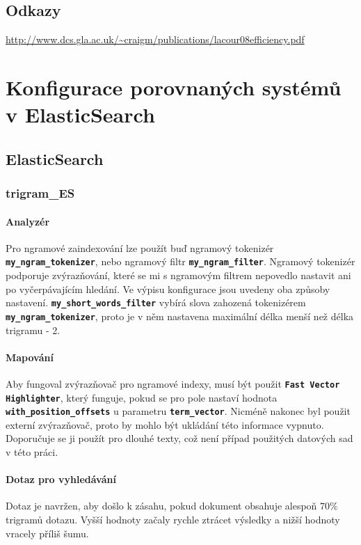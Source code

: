 \documentclass[11pt,letterpaper,oneside,openright]{book}
\newcommand{\bftt}[1]{\texttt{\textbf{#1}}}
\begin{document}
\section*{Odkazy}
\url{http://www.dcs.gla.ac.uk/~craigm/publications/lacour08efficiency.pdf}




\appendix
\chapter{Konfigurace porovnaných systémů v ElasticSearch}\label{appendix:search_config}
\section{ElasticSearch}
\subsection{trigram\_ES}
\subsubsection{Analyzér}
Pro ngramové zaindexování lze použít buď ngramový tokenizér
\bftt{my\_ngram\_tokenizer}, nebo ngramový filtr \bftt{my\_ngram\_filter}.
Ngramový tokenizér podporuje zvýrazňování, které se mi s ngramovým filtrem
nepovedlo nastavit ani po vyčerpávajícím hledání. Ve výpisu konfigurace jsou
uvedeny oba způsoby nastavení. \bftt{my\_short\_words\_filter} vybírá slova
zahozená tokenizérem \bftt{my\_ngram\_tokenizer}, proto je v něm nastavena
maximální délka menší než délka trigramu - 2.



\subsubsection{Mapování}
Aby fungoval zvýrazňovač pro ngramové indexy, musí být použit \bftt{Fast
Vector Highlighter}, který funguje, pokud se pro pole nastaví hodnota
\bftt{with\_position\_offsets} u parametru \bftt{term\_vector}. Nicméně
nakonec byl použit externí zvýrazňovač, proto by mohlo být ukládání této
informace vypnuto. Doporučuje se ji použít pro dlouhé texty, což není
případ použitých datových sad v této práci.



\subsubsection{Dotaz pro vyhledávání}
Dotaz je navržen, aby došlo k zásahu, pokud dokument obsahuje alespoň
$70\%$ trigramů dotazu. Vyšší hodnoty začaly rychle ztrácet výsledky a
nižší hodnoty vracely příliš šumu.
\end{document}
